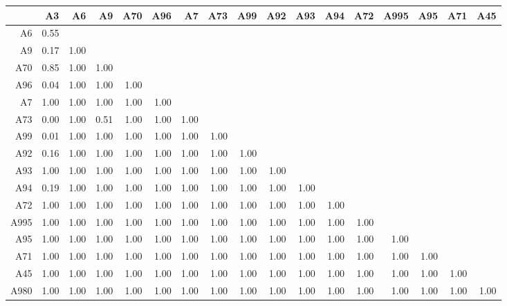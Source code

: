 \documentclass[a4paper,headsepline,footsepline,fontsize=11pt,BCOR=12mm,DIV=12]{report}
\begin{document}
\begin{table}[h]
	\tiny
	\setlength{\tabcolsep}{4pt}
	\centering
	\begin{tabular}{rrrrrrrrrrrrrrrrr}
		\toprule
		& A3 & A6 & A9 & A70 & A96 & A7 & A73 & A99 & A92 & A93 & A94 & A72 & A995 & A95 & A71 & A45 \\ 
		\midrule
		A6 & 0.55 &  &  &  &  &  &  &  &  &  &  &  &  &  &  &  \\ 
		A9 & 0.17 & 1.00 &  &  &  &  &  &  &  &  &  &  &  &  &  &  \\ 
		A70 & 0.85 & 1.00 & 1.00 &  &  &  &  &  &  &  &  &  &  &  &  &  \\ 
		A96 & 0.04 & 1.00 & 1.00 & 1.00 &  &  &  &  &  &  &  &  &  &  &  &  \\ 
		A7 & 1.00 & 1.00 & 1.00 & 1.00 & 1.00 &  &  &  &  &  &  &  &  &  &  &  \\ 
		A73 & 0.00 & 1.00 & 0.51 & 1.00 & 1.00 & 1.00 &  &  &  &  &  &  &  &  &  &  \\ 
		A99 & 0.01 & 1.00 & 1.00 & 1.00 & 1.00 & 1.00 & 1.00 &  &  &  &  &  &  &  &  &  \\ 
		A92 & 0.16 & 1.00 & 1.00 & 1.00 & 1.00 & 1.00 & 1.00 & 1.00 &  &  &  &  &  &  &  &  \\ 
		A93 & 1.00 & 1.00 & 1.00 & 1.00 & 1.00 & 1.00 & 1.00 & 1.00 & 1.00 &  &  &  &  &  &  &  \\ 
		A94 & 0.19 & 1.00 & 1.00 & 1.00 & 1.00 & 1.00 & 1.00 & 1.00 & 1.00 & 1.00 &  &  &  &  &  &  \\ 
		A72 & 1.00 & 1.00 & 1.00 & 1.00 & 1.00 & 1.00 & 1.00 & 1.00 & 1.00 & 1.00 & 1.00 &  &  &  &  &  \\ 
		A995 & 1.00 & 1.00 & 1.00 & 1.00 & 1.00 & 1.00 & 1.00 & 1.00 & 1.00 & 1.00 & 1.00 & 1.00 &  &  &  &  \\ 
		A95 & 1.00 & 1.00 & 1.00 & 1.00 & 1.00 & 1.00 & 1.00 & 1.00 & 1.00 & 1.00 & 1.00 & 1.00 & 1.00 &  &  &  \\ 
		A71 & 1.00 & 1.00 & 1.00 & 1.00 & 1.00 & 1.00 & 1.00 & 1.00 & 1.00 & 1.00 & 1.00 & 1.00 & 1.00 & 1.00 &  &  \\ 
		A45 & 1.00 & 1.00 & 1.00 & 1.00 & 1.00 & 1.00 & 1.00 & 1.00 & 1.00 & 1.00 & 1.00 & 1.00 & 1.00 & 1.00 & 1.00 &  \\ 
		A980 & 1.00 & 1.00 & 1.00 & 1.00 & 1.00 & 1.00 & 1.00 & 1.00 & 1.00 & 1.00 & 1.00 & 1.00 & 1.00 & 1.00 & 1.00 & 1.00 \\
		  \hline
	\end{tabular}
\end{table}
\end{document}
